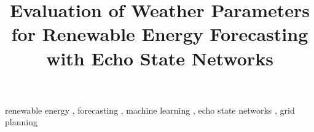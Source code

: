 \documentclass[review]{elsarticle}
\begin{document}
\begin{frontmatter}
\title{Evaluation of Weather Parameters for Renewable Energy Forecasting with Echo State Networks}






\begin{keyword}
renewable energy \sep
forecasting \sep
machine learning \sep
echo state networks \sep
grid planning
\end{keyword}


\end{frontmatter}
\glsresetall

\linenumbers











%
\end{document}
